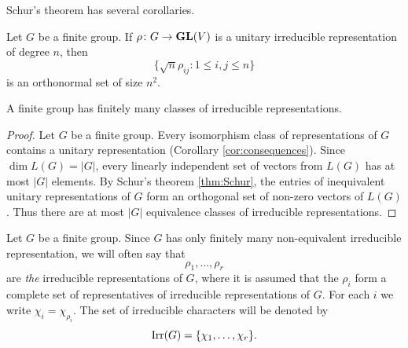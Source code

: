 Schur's theorem has several 
corollaries.

\begin{exercise}
Let $G$ be a finite group. 
If $\rho\colon G\to\mathbf{GL}(V)$ is a unitary irreducible representation
of degree $n$, then
\[
\{\sqrt{n}\rho_{ij}:1\leq i,j\leq n\}
\]
is an orthonormal set of size $n^2$.
\end{exercise}






\begin{corollary}
     A finite group has finitely many classes of irreducible representations. 
\end{corollary}

\begin{proof}
     Let $G$ be a finite group. 
     Every isomorphism class of representations of $G$ contains a unitary representation (Corollary \ref{cor:consequences}). 
     Since $\dim L(G)=|G|$, every linearly independent set 
     of vectors from $L(G)$ has at most $|G|$ elements. By
     Schur's theorem \ref{thm:Schur}, the entries
     of inequivalent unitary representations of $G$ 
     form an orthogonal set of non-zero vectors of $L(G)$. Thus
     there are at most $|G|$ equivalence classes of irreducible
     representations. 
\end{proof}

Let $G$ be a finite group. Since $G$ has only finitely many non-equivalent 
irreducible representation, we will often say
that 
\[
\rho_1,\dots,\rho_r
\]
are \emph{the} irreducible representations of $G$, where it is assumed that
the $\rho_i$ form a complete set of 
representatives of irreducible representations of $G$. For each $i$ we write
$\chi_i=\chi_{\rho_i}$. The set of irreducible characters will be denoted
by 
\[
\operatorname{Irr}(G)=\{\chi_1,\dots,\chi_r\}.
\]

